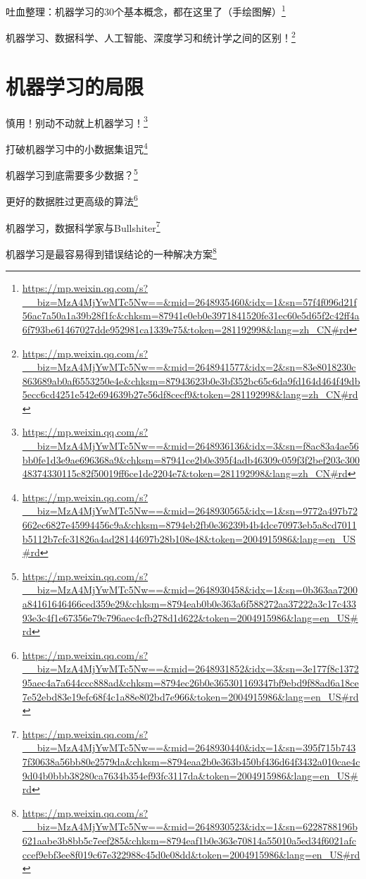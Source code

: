 \documentclass[]{ctexbook}
\renewcommand{\href}[2]{#2\footnote{\url{#1}}}
\begin{document}
\href{https://mp.weixin.qq.com/s?__biz=MzA4MjYwMTc5Nw==\&mid=2648935460\&idx=1\&sn=57f4f096d21f56ac7a50a1a39b28f1fc\&chksm=87941e0eb0e3971841520fe31ec60e5d65f2c42ff4a6f793be61467027dde952981ca1339e75\&token=281192998\&lang=zh_CN\#rd}{吐血整理：机器学习的30个基本概念，都在这里了（手绘图解）}

\href{https://mp.weixin.qq.com/s?__biz=MzA4MjYwMTc5Nw==\&mid=2648941577\&idx=2\&sn=83e8018230c863689ab0af6553250e4e\&chksm=87943623b0e3bf352bc65c6da9fd164d464f49db5ecc6cd4251e542e694639b27e56df8cecf9\&token=281192998\&lang=zh_CN\#rd}{机器学习、数据科学、人工智能、深度学习和统计学之间的区别！}

\hypertarget{ux673aux5668ux5b66ux4e60ux7684ux5c40ux9650}{%
\section{机器学习的局限}\label{ux673aux5668ux5b66ux4e60ux7684ux5c40ux9650}}

\href{https://mp.weixin.qq.com/s?__biz=MzA4MjYwMTc5Nw==\&mid=2648936136\&idx=3\&sn=f8ac83a4ae56bb0fe1d3e9ae696368a9\&chksm=87941ce2b0e395f4adb46309c059f3f2bef203c30048374330115c82f50019ff6ce1de2204e7\&token=281192998\&lang=zh_CN\#rd}{慎用！别动不动就上机器学习！}

\href{https://mp.weixin.qq.com/s?__biz=MzA4MjYwMTc5Nw==\&mid=2648930565\&idx=1\&sn=9772a497b72662ec6827e45994456c9a\&chksm=8794eb2fb0e36239b4b4dce70973eb5a8cd7011b5112b7cfc31826a4ad28144697b28b108e48\&token=2004915986\&lang=en_US\#rd}{打破机器学习中的小数据集诅咒}

\href{https://mp.weixin.qq.com/s?__biz=MzA4MjYwMTc5Nw==\&mid=2648930458\&idx=1\&sn=0b363aa7200a84161646466ced359e29\&chksm=8794eab0b0e363a6f588272aa37222a3c17c43393e3c4f1e67356e79c796aec4cfb278d1d622\&token=2004915986\&lang=en_US\#rd}{机器学习到底需要多少数据？}

\href{https://mp.weixin.qq.com/s?__biz=MzA4MjYwMTc5Nw==\&mid=2648931852\&idx=3\&sn=3e177f8c137295aec4a7a644ccc888ad\&chksm=8794ec26b0e365301169347bf9ebd9f88ad6a18ce7e52ebd83e19efc68f4c1a88e802bd7e966\&token=2004915986\&lang=en_US\#rd}{更好的数据胜过更高级的算法}

\href{https://mp.weixin.qq.com/s?__biz=MzA4MjYwMTc5Nw==\&mid=2648930440\&idx=1\&sn=395f715b7437f30638a56bb80e2579da\&chksm=8794eaa2b0e363b450bf436d64f3432a010cae4c9d04b0bbb38280ca7634b354ef93fc3117da\&token=2004915986\&lang=en_US\#rd}{机器学习，数据科学家与Bullshiter}

\href{https://mp.weixin.qq.com/s?__biz=MzA4MjYwMTc5Nw==\&mid=2648930523\&idx=1\&sn=6228788196b621aabe3b8bb5c7eef285\&chksm=8794eaf1b0e363e70814a55010a5ed34f6021afcccef9ebf3ee8f019c67e322988c45d0e08dd\&token=2004915986\&lang=en_US\#rd}{机器学习是最容易得到错误结论的一种解决方案}
\end{document}
